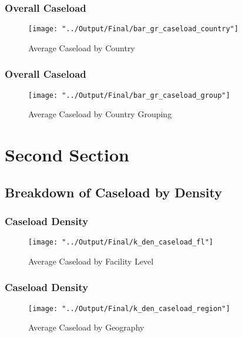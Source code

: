 \documentclass{beamer}
\begin{document}


		\begin{frame}
		\frametitle{Overall Caseload}
			\begin{figure}[H] 
				\centering
					\caption{Average Caseload by Country} 
				\texttt{[image: "../Output/Final/bar\_gr\_caseload\_country"]}
			\end{figure}
		\end{frame}

	
	\begin{frame}
		\frametitle{Overall Caseload}
			\begin{figure}[H] 
				\centering
				\caption{Average Caseload by Country Grouping} 
				\texttt{[image: "../Output/Final/bar\_gr\_caseload\_group"]}
			\end{figure}
	\end{frame}
	
	
	\section{Second Section}
	\subsection{Breakdown of Caseload by Density} 
	
	
		\begin{frame}
			\frametitle{Caseload Density}
			\begin{figure}[H] 
				\centering
				\caption{Average Caseload by Facility Level} 
				\texttt{[image: "../Output/Final/k\_den\_caseload\_fl"]}
			\end{figure}
		\end{frame}
	
	
	\begin{frame}
		\frametitle{Caseload Density}
		\begin{figure}[H] 
			\centering
			\caption{Average Caseload by Geography} 
			\texttt{[image: "../Output/Final/k\_den\_caseload\_region"]}
		\end{figure}
	\end{frame}
\end{document}
